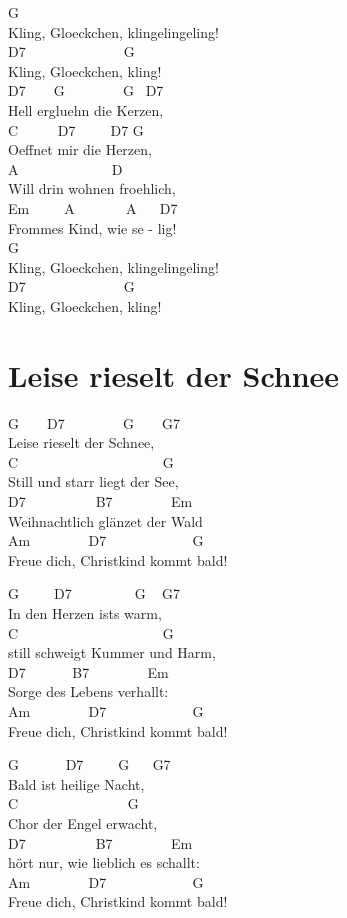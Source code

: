 \documentclass[
  letterpaper,
]{scrbook}
\begin{document}
G\\
Kling, Gloeckchen, klingelingeling!\\
D7 ~ ~ ~ ~ ~ ~ ~ ~ G\\
Kling, Gloeckchen, kling!\\
D7 ~ ~ G ~ ~ ~ ~ ~G ~D7\\
Hell ergluehn die Kerzen,\\
C ~ ~ ~ D7 ~ ~ ~D7 G\\
Oeffnet mir die Herzen,\\
A ~ ~ ~ ~ ~ ~ ~ ~D\\
Will drin wohnen froehlich,\\
Em ~ ~ ~A ~ ~ ~ ~ A ~ ~D7\\
Frommes Kind, wie se - lig!\\
G\\
Kling, Gloeckchen, klingelingeling!\\
D7 ~ ~ ~ ~ ~ ~ ~ ~ G\\
Kling, Gloeckchen, kling!

\hypertarget{leise-rieselt-der-schnee}{%
\chapter{Leise rieselt der Schnee}\label{leise-rieselt-der-schnee}}

G ~ ~ D7 ~ ~ ~ ~ ~G ~ ~ G7\\
Leise rieselt der Schnee,\\
C ~ ~ ~ ~ ~ ~ ~ ~ ~ ~ ~ ~ G\\
Still und starr liegt der See,\\
D7 ~ ~ ~ ~ ~ ~B7 ~ ~ ~ ~ ~Em\\
Weihnachtlich glänzet der Wald\\
Am ~ ~ ~ ~ ~D7 ~ ~ ~ ~ ~ ~ ~ G\\
Freue dich, Christkind kommt bald!

G ~ ~ ~D7 ~ ~ ~ ~ ~ G ~ G7\\
In den Herzen ist\textquotesingle s warm,\\
C ~ ~ ~ ~ ~ ~ ~ ~ ~ ~ ~ ~ G\\
still schweigt Kummer und Harm,\\
D7 ~ ~ ~ ~B7 ~ ~ ~ ~ ~Em\\
Sorge des Lebens verhallt:\\
Am ~ ~ ~ ~ ~D7 ~ ~ ~ ~ ~ ~ ~ G\\
Freue dich, Christkind kommt bald!

G ~ ~ ~ ~D7 ~ ~ ~G ~ ~G7\\
Bald ist heilige Nacht,\\
C ~ ~ ~ ~ ~ ~ ~ ~ ~ G\\
Chor der Engel erwacht,\\
D7 ~ ~ ~ ~ ~ ~B7 ~ ~ ~ ~ ~Em\\
hört nur, wie lieblich es schallt:\\
Am ~ ~ ~ ~ ~D7 ~ ~ ~ ~ ~ ~ ~ G\\
Freue dich, Christkind kommt bald!
\end{document}
